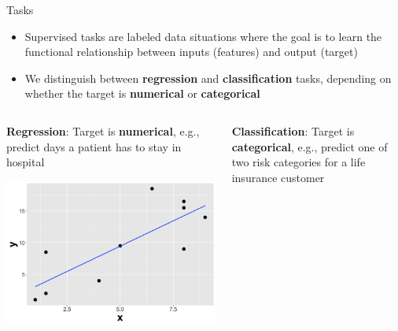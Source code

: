 \documentclass[11pt,compress,t,notes=noshow, xcolor=table]{beamer}
\begin{document}
\begin{vbframe}{Tasks}
\begin{itemize}
    \item Supervised tasks are labeled data situations where the goal is to learn the functional
        relationship between inputs (features) and output (target)

    \item We distinguish between \textbf{regression} and \textbf{classification} tasks, depending on whether the
        target is \textbf{numerical} or \textbf{categorical}
\end{itemize}

\lz

\begin{columns}
\begin{column}{0.4\textwidth}
\small \textbf{Regression}: Target is \textbf{numerical}, e.g., predict days a patient has to stay in hospital

  \begin{center}
    \includegraphics[width=\textwidth]{figure/nutshell-ml-basics-supervised-regression-task.png}
  \end{center}
\end{column}

\begin{column}{0.4\textwidth}
\small \textbf{Classification}: Target is \textbf{categorical}, e.g., predict one of two risk categories for a life insurance customer


\end{column}
\end{columns}
\end{vbframe}
\end{document}
